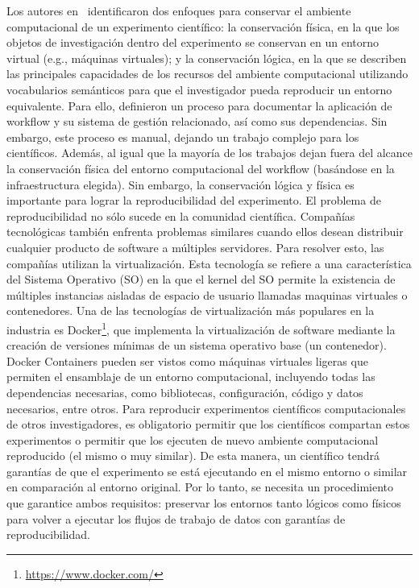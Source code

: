 
Los autores en~\cite{santana2017reproducibility} identificaron dos enfoques para conservar el ambiente computacional de un experimento científico: la conservación física, en la que los objetos de investigación dentro del experimento se conservan en un entorno virtual (e.g., máquinas virtuales); y la conservación lógica, en la que se describen las principales capacidades de los recursos del ambiente computacional utilizando vocabularios semánticos para que el investigador pueda reproducir un entorno equivalente.
Para ello, definieron un proceso para documentar la aplicación de workflow y su sistema de gestión relacionado, así como sus dependencias.
Sin embargo, este proceso es manual, dejando un trabajo complejo para los científicos. 
Además, al igual que la mayoría de los trabajos dejan fuera del alcance la conservación física del entorno computacional del workflow (basándose en la infraestructura elegida).
Sin embargo, la conservación lógica y física es importante para lograr la reproducibilidad del experimento.
El problema de reproducibilidad no sólo sucede en la comunidad científica. Compañías tecnológicas también enfrenta problemas similares cuando ellos desean distribuir cualquier producto de software a múltiples servidores.
Para resolver esto, las compañías utilizan la virtualización. Esta tecnología se refiere a una característica del Sistema Operativo (SO) en la que el kernel del SO permite la existencia de múltiples instancias aisladas de espacio de usuario llamadas maquinas virtuales o contenedores.
Una de las tecnologías de virtualización más populares en la industria es Docker\footnote{\url{https://www.docker.com/}}, que implementa la virtualización de software mediante la creación de versiones mínimas de un sistema operativo base (un contenedor).
Docker Containers pueden ser vistos como máquinas virtuales ligeras que permiten el ensamblaje de un entorno computacional, incluyendo todas las dependencias necesarias, como bibliotecas, configuración, código y datos necesarios, entre otros.
Para reproducir experimentos científicos computacionales de otros investigadores, es obligatorio permitir que los científicos compartan estos experimentos o permitir que los ejecuten de nuevo ambiente computacional reproducido (el mismo o muy similar).
De esta manera, un científico tendrá garantías de que el experimento se está ejecutando en el mismo entorno o similar en comparación al entorno original.
Por lo tanto, se necesita un procedimiento que garantice ambos requisitos: preservar los entornos tanto lógicos como físicos para volver a ejecutar los flujos de trabajo de datos con garantías de reproducibilidad.
